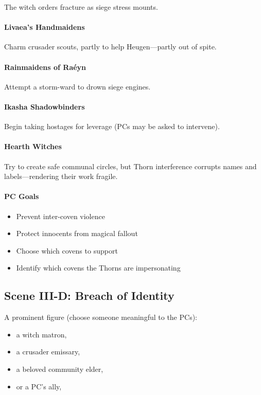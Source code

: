 \documentclass[11pt]{book}
\begin{document}
The witch orders fracture as siege stress mounts.

\paragraph{Livaea's Handmaidens}
Charm crusader scouts, partly to help Heugen---partly out of spite.

\paragraph{Rainmaidens of Raéyn}
Attempt a storm-ward to drown siege engines.

\paragraph{Ikasha Shadowbinders}
Begin taking hostages for leverage (PCs may be asked to intervene).

\paragraph{Hearth Witches}
Try to create safe communal circles, but Thorn interference corrupts
names and labels---rendering their work fragile.

\paragraph{PC Goals}
\begin{itemize}[leftmargin=*]
    \item Prevent inter-coven violence
    \item Protect innocents from magical fallout
    \item Choose which covens to support
    \item Identify which covens the Thorns are impersonating
\end{itemize}

\subsection*{Scene III-D: Breach of Identity}

A prominent figure (choose someone meaningful to the PCs):
\begin{itemize}
    \item a witch matron,
    \item a crusader emissary,
    \item a beloved community elder,
    \item or a PC's ally,
\end{itemize}
\end{document}
